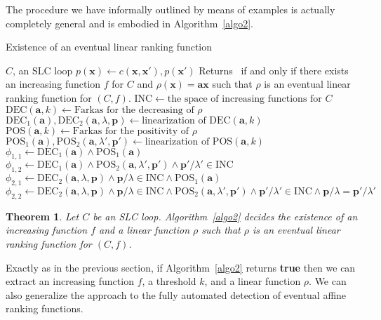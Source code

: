 \documentclass{acm_proc_article-sp}
\newtheorem{theorem}{Theorem}[section]
\newcommand{\dec}{\mathrm{DEC}}
\newcommand{\pos}{\mathrm{POS}}
\newcommand{\inc}{\mathrm{INC}}
\begin{document}
The procedure we have informally outlined by means of examples is
actually completely general and is embodied in Algorithm~\ref{algo2}.

\begin{algorithm}
\caption{Existence of an eventual linear ranking function}
\label{algo2}
\begin{algorithmic}[1]
\REQUIRE
$C$, an SLC loop
$p(\mathbf{x}) \leftarrow c(\mathbf{x}, \mathbf{x}'), p(\mathbf{x}')$
\ENSURE
Returns \TRUE\ if and only if there exists an increasing function $f$
for $C$ and
$\rho(\mathbf{x}) = \mathbf{a} \mathbf{x}$
such that $\rho$ is an eventual linear ranking function for $(C, f)$.
\STATE
$\inc \gets \text{the space of increasing functions for $C$}$
\STATE
$\dec(\mathbf{a}, k) \gets \text{Farkas for the decreasing of $\rho$}$
\STATE
$\dec_1(\mathbf{a}), \dec_2(\mathbf{a}, \lambda, \mathbf{p}) \gets \text{linearization of $\dec(\mathbf{a}, k)$}$
\STATE
$\pos(\mathbf{a}, k) \gets \text{Farkas for the positivity of $\rho$}$
\STATE
$\pos_1(\mathbf{a}), \pos_2(\mathbf{a},\lambda', \mathbf{p'}) \gets \text{linearization of $\pos(\mathbf{a}, k)$}$
\STATE
$\phi_{1,1} \gets \dec_1(\mathbf{a}) \land \pos_1(\mathbf{a})$
\STATE
 $\phi_{1,2} \gets \dec_1(\mathbf{a}) \land \pos_2(\mathbf{a},\lambda',\mathbf{p'})
 					\land \mathbf{p'} / \lambda' \in \inc$
 \STATE
 $\phi_{2,1} \gets \dec_2(\mathbf{a},\lambda,\mathbf{p}) \land \mathbf{p} / \lambda \in \inc
 					\land \pos_1(\mathbf{a})$
 \STATE
$\phi_{2,2} \gets \dec_2(\mathbf{a},\lambda,\mathbf{p}) \land \mathbf{p} / \lambda \in \inc
					\land \pos_2(\mathbf{a},\lambda',\mathbf{p'}) \land \mathbf{p'} / \lambda' \in \inc
					\land \mathbf{p} / \lambda = \mathbf{p'} / \lambda'$
\RETURN \TRUE
\ELSE  \RETURN \FALSE
\ENDIF
\end{algorithmic}
\end{algorithm}

\begin{theorem}
\label{algo2-is-a-decision-procedure-for-elrf}
Let $C$ be an SLC loop.
\textup{Algorithm~\ref{algo2}} decides the existence of an increasing
function $f$ and a linear function $\rho$ such that $\rho$ is an
eventual linear ranking function for $(C, f)$.
\end{theorem}

Exactly as in the previous section, if Algorithm~\ref{algo2}
returns \textbf{true} then we can extract an increasing function $f$,
a threshold $k$, and a linear function $\rho$.
We can also generalize the approach to the fully automated
detection of eventual affine ranking functions.
\end{document}
